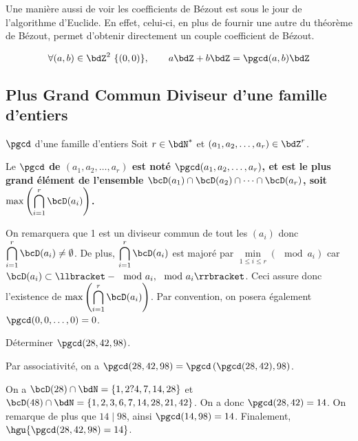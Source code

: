 \documentclass[a4paper,french,bookmarks]{article}
\begin{document}
Une manière aussi de voir les coefficients de Bézout est sous le jour de l'algorithme d'Euclide. En effet, celui-ci, en plus de fournir une autre  du théorème de Bézout, permet d'obtenir directement un couple coefficient de Bézout.

\begin{corollary}{}{}
    \[ \forall (a, b) \in \bdZ^2 \ \{(0, 0)\},\qquad a\bdZ + b\bdZ = \pgcd(a, b)\bdZ\]
\end{corollary}
\demoth{
}

\subsection{Plus Grand Commun Diviseur d'une famille d'entiers}

\begin{definition}{$\pgcd$ d'une famille d'entiers}{}
    Soit $r \in \bdN^*$ et $(a_1, a_2, \dots, a_r) \in \bdZ^r$.
    
    Le \bf{$\pgcd$} de $(a_1, a_2, \dots, a_r)$ est noté $\pgcd(a_1, a_2, \dots, a_r)$, et est le plus grand élément de l'ensemble $\bcD(a_1) \cap \bcD(a_2) \cap \dots \cap \bcD(a_r)$, soit $\displaystyle \max\left(\bigcap_{i=1}^r \bcD(a_i)\right)$.
\end{definition}

On remarquera que 1 est un diviseur commun de tout les $\left(a_i\right)$ donc $\displaystyle \bigcap_{i=1}^r \bcD(a_i) \neq \emptyset$. De plus, $\displaystyle \bigcap_{i=1}^r \bcD(a_i)$ est majoré par $\min\limits_{1 \leq i \leq r}(\mod{a_i})$ car $\bcD(a_i) \subset \llbracket-\mod{a_i}, \mod{a_i}\rrbracket$. Ceci assure donc l'existence de $\displaystyle \max\left(\bigcap_{i=1}^r \bcD(a_i)\right)$. Par convention, on posera également $\pgcd(0, 0, \dots, 0) = 0$.

\begin{example}{}{}
    Déterminer $\pgcd(28, 42, 98)$. \tcblower
    
    Par associativité, on a $\pgcd(28, 42, 98) = \pgcd\left(\pgcd(28, 42), 98\right)$.
    
    On a $\bcD(28) \cap \bdN = \{1, 2? 4, 7, 14, 28\}$ et $\bcD(48) \cap \bdN = \{1, 2, 3, 6, 7, 14, 28, 21, 42\}$. On a donc $\pgcd(28, 42) = 14$. On remarque de plus que $14 \mid 98$, ainsi $\pgcd(14, 98) = 14$. Finalement, $\hgu{\pgcd(28, 42, 98) = 14}$.
\end{example}
\end{document}
